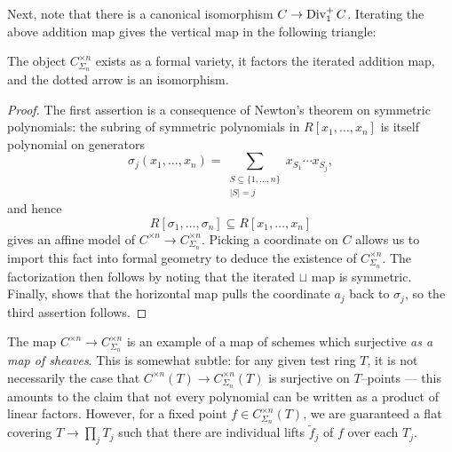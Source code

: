Next, note that there is a canonical isomorphism $C \to \operatorname{Div}_1^+ C$.  Iterating the above addition map gives the vertical map in the following triangle:
\begin{center}
\end{center}
\begin{lemma}
The object $C^{\times n}_{\Sigma_n}$ exists as a formal variety, it factors the iterated addition map, and the dotted arrow is an isomorphism.
\end{lemma}
\begin{proof}
The first assertion is a consequence of Newton's theorem on symmetric polynomials: the subring of symmetric polynomials in $R[x_1, \ldots, x_n]$ is itself polynomial on generators \[\sigma_j(x_1, \ldots, x_n) = \sum_{\substack{S \subseteq \{1, \ldots, n\} \\ |S| = j}} x_{S_1} \cdots x_{S_j},\] and hence \[R[\sigma_1, \ldots, \sigma_n] \subseteq R[x_1, \ldots, x_n]\] gives an affine model of $C^{\times n} \to C^{\times n}_{\Sigma_n}$.  Picking a coordinate on $C$ allows us to import this fact into formal geometry to deduce the existence of $C^{\times n}_{\Sigma_n}$.  The factorization then follows by noting that the iterated $\sqcup$ map is symmetric.  Finally,  shows that the horizontal map pulls the coordinate $a_j$ back to $\sigma_j$, so the third assertion follows.
\end{proof}

\begin{remark}
The map $C^{\times n} \to C^{\times n}_{\Sigma_n}$ is an example of a map of schemes which surjective \emph{as a map of sheaves}.  This is somewhat subtle: for any given test ring $T$, it is not necessarily the case that $C^{\times n}(T) \to C^{\times n}_{\Sigma_n}(T)$ is surjective on $T$--points --- this amounts to the claim that not every polynomial can be written as a product of linear factors.  However, for a fixed point $f \in C^{\times n}_{\Sigma_n}(T)$, we are guaranteed a flat covering $T \to \prod_j T_j$ such that there are individual lifts $\widetilde f_j$ of $f$ over each $T_j$.
\end{remark}

